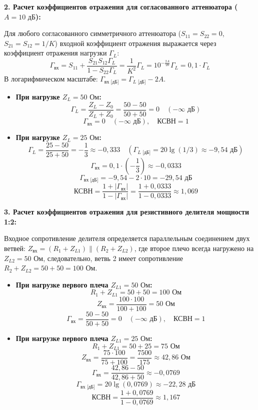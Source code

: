 \vspace{0.3cm}
\textbf{2. Расчет коэффициентов отражения для согласованного аттенюатора ($A = 10\text{ дБ}$):}

Для любого согласованного симметричного аттенюатора ($S_{11} = S_{22} = 0$, $S_{21} = S_{12} = 1/K$) входной коэффициент отражения выражается через коэффициент отражения нагрузки $\Gamma_L$:
$$\Gamma_{\text{вх}} = S_{11} + \frac{S_{21} S_{12} \Gamma_L}{1 - S_{22} \Gamma_L} = \frac{1}{K^2} \Gamma_L = 10^{-\frac{2A}{20}} \Gamma_L = 0{,}1 \cdot \Gamma_L$$
В логарифмическом масштабе: $\Gamma_{\text{вх [дБ]}} = \Gamma_{L\text{ [дБ]}} - 2A$.

\begin{itemize}
    \item \textbf{При нагрузке $Z_L = 50\text{ Ом}$:}
    $$\Gamma_L = \frac{Z_L - Z_0}{Z_L + Z_0} = \frac{50 - 50}{50 + 50} = 0 \quad (-\infty\text{ дБ})$$
    $$\Gamma_{\text{вх}} = 0 \quad (-\infty\text{ дБ}), \quad \text{КСВН} = 1$$

    \item \textbf{При нагрузке $Z_L = 25\text{ Ом}$:}
    $$\Gamma_L = \frac{25 - 50}{25 + 50} = -\frac{1}{3} \approx -0{,}333 \quad (\Gamma_{L\text{ [дБ]}} = 20 \lg(1/3) \approx -9{,}54\text{ дБ})$$
    $$\Gamma_{\text{вх}} = 0{,}1 \cdot \left(-\frac{1}{3}\right) \approx -0{,}0333$$
    $$\Gamma_{\text{вх [дБ]}} = -9{,}54 - 2 \cdot 10 = -29{,}54\text{ дБ}$$
    $$\text{КСВН} = \frac{1 + |\Gamma_{\text{вх}}|}{1 - |\Gamma_{\text{вх}}|} = \frac{1 + 0{,}0333}{1 - 0{,}0333} \approx 1{,}069$$
\end{itemize}

\vspace{0.3cm}
\textbf{3. Расчет коэффициентов отражения для резистивного делителя мощности 1:2:}

Входное сопротивление делителя определяется параллельным соединением двух ветвей: $Z_{\text{вх}} = (R_1 + Z_{L1}) \parallel (R_2 + Z_{L2})$, где второе плечо всегда нагружено на $Z_{L2} = 50\text{ Ом}$, следовательно, ветвь 2 имеет сопротивление $R_2 + Z_{L2} = 50 + 50 = 100\text{ Ом}$.

\begin{itemize}
    \item \textbf{При нагрузке первого плеча $Z_{L1} = 50\text{ Ом}$:}
    $$R_1 + Z_{L1} = 50 + 50 = 100\text{ Ом}$$
    $$Z_{\text{вх}} = \frac{100 \cdot 100}{100 + 100} = 50\text{ Ом}$$
    $$\Gamma_{\text{вх}} = \frac{50 - 50}{50 + 50} = 0 \quad (-\infty\text{ дБ}), \quad \text{КСВН} = 1$$

    \item \textbf{При нагрузке первого плеча $Z_{L1} = 25\text{ Ом}$:}
    $$R_1 + Z_{L1} = 50 + 25 = 75\text{ Ом}$$
    $$Z_{\text{вх}} = \frac{75 \cdot 100}{75 + 100} = \frac{7500}{175} \approx 42{,}86\text{ Ом}$$
    $$\Gamma_{\text{вх}} = \frac{42{,}86 - 50}{42{,}86 + 50} \approx -0{,}0769$$
    $$\Gamma_{\text{вх [дБ]}} = 20 \lg(0{,}0769) \approx -22{,}28\text{ дБ}$$
    $$\text{КСВН} = \frac{1 + 0{,}0769}{1 - 0{,}0769} \approx 1{,}167$$
\end{itemize}


